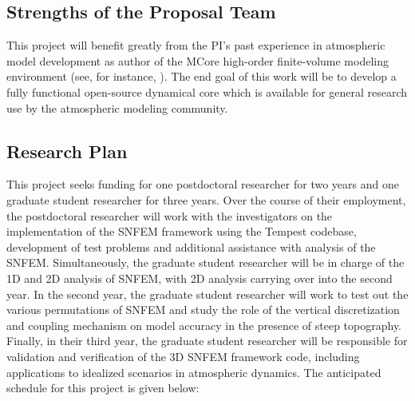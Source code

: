 \documentclass[11pt]{article}
\begin{document}
\subsection{Strengths of the Proposal Team}

This project will benefit greatly from the PI's past experience in atmospheric model development as author of the MCore high-order finite-volume modeling environment (see, for instance, \cite{PAUCJBVL2010JCP,PAUCJ2012MWR,PAUCJ2012JCP}).  The end goal of this work will be to develop a fully functional open-source dynamical core which is available for general research use by the atmospheric modeling community.

\subsection{Research Plan} \label{sec:ResearchPlan}

This project seeks funding for one postdoctoral researcher for two years and one graduate student researcher for three years.  Over the course of their employment, the postdoctoral researcher will work with the investigators on the implementation of the SNFEM framework using the Tempest codebase, development of test problems and additional assistance with analysis of the SNFEM.  Simultaneously, the graduate student researcher will be in charge of the 1D and 2D analysis of SNFEM, with 2D analysis carrying over into the second year.  In the second year, the graduate student researcher will work to test out the various permutations of SNFEM and study the role of the vertical discretization and coupling mechanism on model accuracy in the presence of steep topography.  Finally, in their third year, the graduate student researcher will be responsible for validation and verification of the 3D SNFEM framework code, including applications to idealized scenarios in atmospheric dynamics.  The anticipated schedule for this project is given below:
\end{document}
